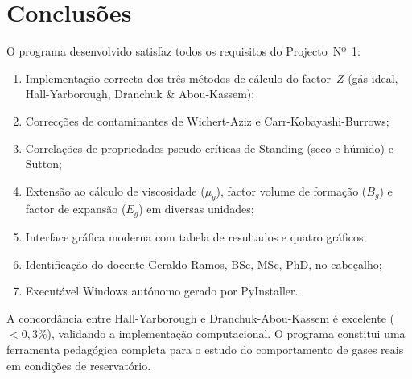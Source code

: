 \documentclass[12pt,a4paper]{article}
\begin{document}
\section{Conclusões}

O programa desenvolvido satisfaz todos os requisitos do Projecto~Nº~1:

\begin{enumerate}[noitemsep]
  \item Implementação correcta dos três métodos de cálculo do factor~$Z$
    (gás ideal, Hall-Yarborough, Dranchuk \& Abou-Kassem);
  \item Correcções de contaminantes de Wichert-Aziz e Carr-Kobayashi-Burrows;
  \item Correlações de propriedades pseudo-críticas de Standing (seco e húmido)
    e Sutton;
  \item Extensão ao cálculo de viscosidade ($\mu_g$), factor volume de formação
    ($B_g$) e factor de expansão ($E_g$) em diversas unidades;
  \item Interface gráfica moderna com tabela de resultados e quatro gráficos;
  \item Identificação do docente Geraldo Ramos, BSc, MSc, PhD, no cabeçalho;
  \item Executável Windows autónomo gerado por PyInstaller.
\end{enumerate}

A concordância entre Hall-Yarborough e Dranchuk-Abou-Kassem é excelente
($<0{,}3\%$), validando a implementação computacional. O programa constitui
uma ferramenta pedagógica completa para o estudo do comportamento de gases
reais em condições de reservatório.
\end{document}
